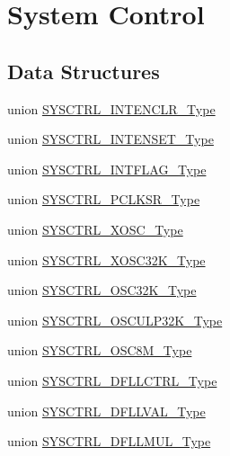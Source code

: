 \hypertarget{group___s_a_m_d21___s_y_s_c_t_r_l}{}\section{System Control}
\label{group___s_a_m_d21___s_y_s_c_t_r_l}
\subsection*{Data Structures}
\begin{DoxyCompactItemize}
\item 
union \mbox{\hyperlink{union_s_y_s_c_t_r_l___i_n_t_e_n_c_l_r___type}{S\+Y\+S\+C\+T\+R\+L\+\_\+\+I\+N\+T\+E\+N\+C\+L\+R\+\_\+\+Type}}
\item 
union \mbox{\hyperlink{union_s_y_s_c_t_r_l___i_n_t_e_n_s_e_t___type}{S\+Y\+S\+C\+T\+R\+L\+\_\+\+I\+N\+T\+E\+N\+S\+E\+T\+\_\+\+Type}}
\item 
union \mbox{\hyperlink{union_s_y_s_c_t_r_l___i_n_t_f_l_a_g___type}{S\+Y\+S\+C\+T\+R\+L\+\_\+\+I\+N\+T\+F\+L\+A\+G\+\_\+\+Type}}
\item 
union \mbox{\hyperlink{union_s_y_s_c_t_r_l___p_c_l_k_s_r___type}{S\+Y\+S\+C\+T\+R\+L\+\_\+\+P\+C\+L\+K\+S\+R\+\_\+\+Type}}
\item 
union \mbox{\hyperlink{union_s_y_s_c_t_r_l___x_o_s_c___type}{S\+Y\+S\+C\+T\+R\+L\+\_\+\+X\+O\+S\+C\+\_\+\+Type}}
\item 
union \mbox{\hyperlink{union_s_y_s_c_t_r_l___x_o_s_c32_k___type}{S\+Y\+S\+C\+T\+R\+L\+\_\+\+X\+O\+S\+C32\+K\+\_\+\+Type}}
\item 
union \mbox{\hyperlink{union_s_y_s_c_t_r_l___o_s_c32_k___type}{S\+Y\+S\+C\+T\+R\+L\+\_\+\+O\+S\+C32\+K\+\_\+\+Type}}
\item 
union \mbox{\hyperlink{union_s_y_s_c_t_r_l___o_s_c_u_l_p32_k___type}{S\+Y\+S\+C\+T\+R\+L\+\_\+\+O\+S\+C\+U\+L\+P32\+K\+\_\+\+Type}}
\item 
union \mbox{\hyperlink{union_s_y_s_c_t_r_l___o_s_c8_m___type}{S\+Y\+S\+C\+T\+R\+L\+\_\+\+O\+S\+C8\+M\+\_\+\+Type}}
\item 
union \mbox{\hyperlink{union_s_y_s_c_t_r_l___d_f_l_l_c_t_r_l___type}{S\+Y\+S\+C\+T\+R\+L\+\_\+\+D\+F\+L\+L\+C\+T\+R\+L\+\_\+\+Type}}
\item 
union \mbox{\hyperlink{union_s_y_s_c_t_r_l___d_f_l_l_v_a_l___type}{S\+Y\+S\+C\+T\+R\+L\+\_\+\+D\+F\+L\+L\+V\+A\+L\+\_\+\+Type}}
\item 
union \mbox{\hyperlink{union_s_y_s_c_t_r_l___d_f_l_l_m_u_l___type}{S\+Y\+S\+C\+T\+R\+L\+\_\+\+D\+F\+L\+L\+M\+U\+L\+\_\+\+Type}}

\end{DoxyCompactItemize}

